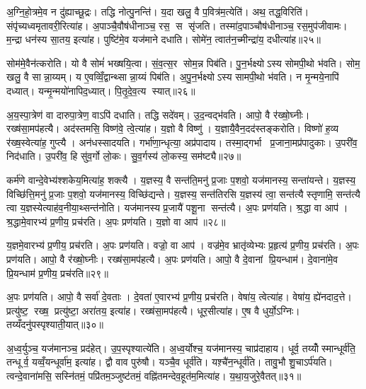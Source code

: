 अ॒ग्नि॒हो॒त्रमे॒व न दु॑ह्याच्छू॒द्रः। तद्धि नोत्पु॒नन्ति॑। य॒दा खलु॒ वै प॒वित्र॑म॒त्येति॑। अथ॒ तद्ध॒विरिति॑। संपृ॑च्यध्वमृतावरी॒रित्या॑ह। अ॒पाञ्चै॒वौष॑धीनाञ्च॒ रस॒ स सृ॑जति। तस्मा॑द॒पाञ्चौष॑धीनाञ्च॒ रस॒मुप॑जीवामः। म॒न्द्रा धन॑स्य सा॒तय॒ इत्या॑ह। पुष्टि॑मे॒व यज॑माने दधाति। सोमे॑न॒ त्वात॑न॒च्मीन्द्रा॑य॒ दधीत्या॑ह॥२५॥

सोम॑मे॒वैन॑त्करोति। यो वै सोमं॑ भख्षयि॒त्वा। सं॒व॒त्स॒र सोम॒न्न पिब॑ति। पु॒न॒र्भक्ष्योऽस्य सोमपी॒थो भ॑वति। सोम॒ खलु॒ वै सान्ना॒य्यम्। य ए॒वव्विँ॒द्वान्थ्सान्ना॒य्यं पिब॑ति। अ॒पु॒न॒र्भक्ष्योऽस्य सामपी॒थो भ॑वति। न मृ॒न्मये॒नापि॑ दध्यात्। यन्मृ॒न्मयो॑नापिद॒ध्यात्। पि॒तृ॒दे॒व॒त्य स्यात्॥२६॥

अ॒य॒स्पा॒त्रेण॑ वा दारुपा॒त्रेण॒ वाऽपि॑ दधाति। तद्धि सदे॑वम्। उ॒द॒न्वद्भ॑वति। आपो॒ वै र॑ख्षो॒घ्नीः। रख्ष॑सा॒मप॑हत्यै। अद॑स्तमसि॒ विष्ण॑वे॒ त्वे॒त्या॑ह। य॒ज्ञो वै विष्णु॑। य॒ज्ञायै॒वैन॒दद॑स्तङ्करोति। विष्णो॑ ह॒व्य र॑ख्ष॒स्वेत्या॑ह॒ गुप्त्यै। अन॑धस्सादयति। गर्भा॑णा॒न्धृत्या॒ अप्र॑पादाय। तस्मा॒द्गर्भा प्र॒जाना॒मप्र॑पादुकाः। उ॒परी॑व॒ निद॑धाति। उ॒परी॑व॒ हि सु॑व॒र्गो लो॒कः। सु॒व॒र्गस्य॑ लो॒कस्य॒ सम॑ष्ट्यै॥२७॥

कर्म॑णे वान्दे॒वेभ्य॑श्शकेय॒मित्या॑ह॒ शक्त्यै। य॒ज्ञस्य॒ वै सन्त॑ति॒मनु॑ प्र॒जाः प॒शवो॒ यज॑मानस्य॒ सन्ता॑यन्ते। य॒ज्ञस्य॒ विच्छि॑त्ति॒मनु॑ प्र॒जाः प॒शवो॒ यज॑मानस्य॒ विच्छि॑द्यन्ते। य॒ज्ञस्य॒ सन्त॑तिरसि य॒ज्ञस्य॑ त्वा॒ सन्त॑त्यै स्तृणामि॒ सन्त॑त्यै त्वा य॒ज्ञस्येत्याह॑व॒नीया॒थ्सन्त॑नोति। यज॑मानस्य प्र॒जायै॑ पशू॒ना सन्त॑त्यै। अ॒पः प्रण॑यति। श्र॒द्धा वा आप॑। श्र॒द्धामे॒वारभ्य॑ प्र॒णीय॒ प्रच॑रति। अ॒पः प्रण॑यति। य॒ज्ञो वा आप॑॥२८॥

य॒ज्ञमे॒वारभ्य॑ प्र॒णीय॒ प्रच॑रति। अ॒पः प्रण॑यति। वज्रो॒ वा आप॑। वज्र॑मे॒व भ्रातृ॑व्येभ्यः प्र॒हृत्य॑ प्र॒णीय॒ प्रच॑रति। अ॒पः प्रण॑यति। आपो॒ वै र॑ख्षो॒घ्नीः। रख्ष॑सा॒मप॑हत्यै। अ॒पः प्रण॑यति। आपो॒ वै दे॒वानां प्रि॒यन्धाम॑। दे॒वाना॑मे॒व प्रि॒यन्धाम॑ प्र॒णीय॒ प्रच॑रति॥२९॥

अ॒पः प्रण॑यति। आपो॒ वै सर्वा॑ दे॒वताः। दे॒वता॑ ए॒वारभ्य॑ प्र॒णीय॒ प्रच॑रति। वेषा॑य॒ त्वेत्या॑ह। वेषा॑य॒ ह्ये॑नदाद॒त्ते। प्रत्यु॑ष्ट॒ रख्ष॒ प्रत्यु॑ष्टा॒ अरा॑तय॒ इत्या॑ह। रख्ष॑सा॒मप॑हत्यै। धूर॒सीत्या॑ह। ए॒ष वै धुर्यो॒ऽग्निः। तय्यँदनु॑पस्पृश्याती॒यात्॥३०॥

अ॒ध्व॒र्युञ्च॒ यज॑मानञ्च॒ प्रद॑हेत्। उ॒प॒स्पृश्यात्ये॑ति। अ॒ध्व॒र्योश्च॒ यज॑मानस्य॒ चाप्र॑दाहाय। धूर्व॒ तय्योँस्मान्धूर्व॑ति॒ तन्धूर्व॒ यव्वँ॒यन्धूर्वा॑म॒ इत्या॑ह। द्वौ वाव पुरु॑षौ। यञ्चै॒व धूर्व॑ति। यश़्चै॑न॒न्धूर्व॑ति। तावु॒भौ शु॒चाऽर्प॑यति। त्वन्दे॒वाना॑मसि॒ सस्नि॑तमं॒ पप्रि॑तम॒ञ्जुष्ट॑तमं॒ वह्नि॑तमन्देव॒हूत॑म॒मित्या॑ह। य॒था॒य॒जुरे॒वैतत्॥३१॥

